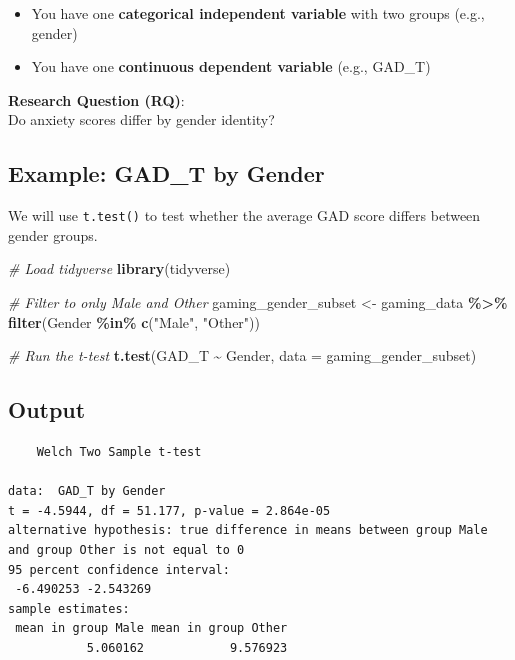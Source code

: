 \documentclass[
]{book}
\newenvironment{Shaded}{\begin{snugshade}}{\end{snugshade}}
\newcommand{\AttributeTok}[1]{\textcolor[rgb]{0.13,0.29,0.53}{#1}}
\newcommand{\CommentTok}[1]{\textcolor[rgb]{0.56,0.35,0.01}{\textit{#1}}}
\newcommand{\FunctionTok}[1]{\textcolor[rgb]{0.13,0.29,0.53}{\textbf{#1}}}
\newcommand{\NormalTok}[1]{#1}
\newcommand{\OtherTok}[1]{\textcolor[rgb]{0.56,0.35,0.01}{#1}}
\newcommand{\SpecialCharTok}[1]{\textcolor[rgb]{0.81,0.36,0.00}{\textbf{#1}}}
\newcommand{\StringTok}[1]{\textcolor[rgb]{0.31,0.60,0.02}{#1}}
\providecommand{\tightlist}{%
  \setlength{\itemsep}{0pt}\setlength{\parskip}{0pt}}
\begin{document}
\begin{itemize}
\tightlist
\item
  You have one \textbf{categorical independent variable} with two groups (e.g., gender)
\item
  You have one \textbf{continuous dependent variable} (e.g., GAD\_T)
\end{itemize}

\textbf{Research Question (RQ)}:\\
Do anxiety scores differ by gender identity?

\subsection{Example: GAD\_T by Gender}\label{example-gad_t-by-gender}

We will use \texttt{t.test()} to test whether the average GAD score differs between gender groups.

\begin{Shaded}
\begin{Highlighting}[]
\CommentTok{\# Load tidyverse}
\FunctionTok{library}\NormalTok{(tidyverse)}

\CommentTok{\# Filter to only Male and Other}
\NormalTok{gaming\_gender\_subset }\OtherTok{\textless{}{-}}\NormalTok{ gaming\_data }\SpecialCharTok{\%\textgreater{}\%}
  \FunctionTok{filter}\NormalTok{(Gender }\SpecialCharTok{\%in\%} \FunctionTok{c}\NormalTok{(}\StringTok{"Male"}\NormalTok{, }\StringTok{"Other"}\NormalTok{))}

\CommentTok{\# Run the t{-}test}
\FunctionTok{t.test}\NormalTok{(GAD\_T }\SpecialCharTok{\textasciitilde{}}\NormalTok{ Gender, }\AttributeTok{data =}\NormalTok{ gaming\_gender\_subset)}
\end{Highlighting}
\end{Shaded}

\subsection{Output}\label{output-2}

\begin{verbatim}
    Welch Two Sample t-test

data:  GAD_T by Gender
t = -4.5944, df = 51.177, p-value = 2.864e-05
alternative hypothesis: true difference in means between group Male and group Other is not equal to 0
95 percent confidence interval:
 -6.490253 -2.543269
sample estimates:
 mean in group Male mean in group Other 
           5.060162            9.576923 
\end{verbatim}
\end{document}
